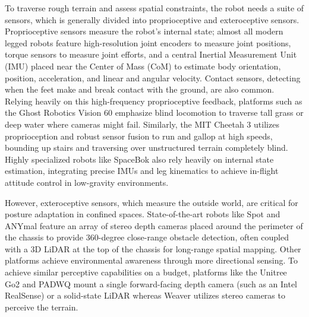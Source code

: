 To traverse rough terrain and assess spatial constraints, the robot needs a suite of sensors, which is generally divided into proprioceptive and exteroceptive sensors. Proprioceptive sensors measure the robot's internal state; almost all modern legged robots feature high-resolution joint encoders to measure joint positions, torque sensors to measure joint efforts, and a central Inertial Measurement Unit (IMU) placed near the Center of Mass (CoM) to estimate body orientation, position, acceleration, and linear and angular velocity. Contact sensors, detecting when the feet make and break contact with the ground, are also common. Relying heavily on this high-frequency proprioceptive feedback, platforms such as the Ghost Robotics Vision 60 \cite{Vision60Ghost} emphasize blind locomotion to traverse tall grass or deep water where cameras might fail. Similarly, the MIT Cheetah 3 \cite{bledtMITCheetah32018} utilizes proprioception and robust sensor fusion \cite{bledtContactModelFusion2018} to run and gallop at high speeds, bounding up stairs and traversing over unstructured terrain completely blind. Highly specialized robots like SpaceBok \cite{armSpaceBokDynamicLegged2019} also rely heavily on internal state estimation, integrating precise IMUs and leg kinematics to achieve in-flight attitude control in low-gravity environments.

However, exteroceptive sensors, which measure the outside world, are critical for posture adaptation in confined spaces. State-of-the-art robots like Spot \cite{Spot, boumanAutonomousSpotLongRange2020} and ANYmal \cite{gehringANYmalFieldSolving2021} feature an array of stereo depth cameras placed around the perimeter of the chassis to provide 360-degree close-range obstacle detection, often coupled with a 3D LiDAR at the top of the chassis for long-range spatial mapping. Other platforms achieve environmental awareness through more directional sensing. To achieve similar perceptive capabilities on a budget, platforms like the Unitree Go2 \cite{UnitreeGo2} and PADWQ \cite{kimPADWQDesignControl2021} mount a single forward-facing depth camera (such as an Intel RealSense) or a solid-state LiDAR whereas Weaver \cite{bjelonicWeaverHexapodRobot2018} utilizes stereo cameras to perceive the terrain. 

